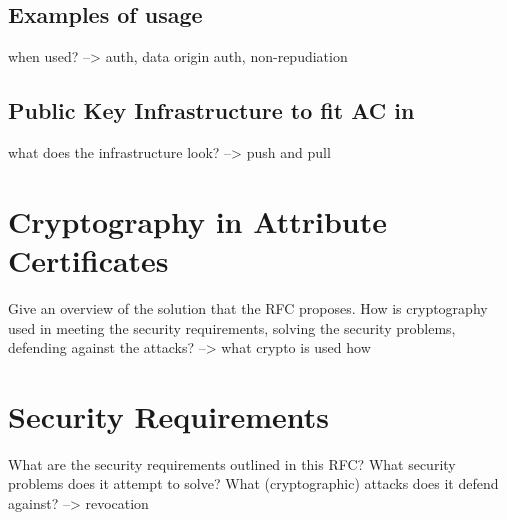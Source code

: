 \documentclass[10pt,conference,a4paper]{IEEEtran}
\begin{document}
\subsection{Examples of usage}
when used? --> auth, data origin auth, non-repudiation

\subsection{Public Key Infrastructure to fit AC in}
what does the infrastructure look? --> push and pull

\section{Cryptography in Attribute Certificates}
\label{cryptography_in_ac}
Give an overview of the solution that the RFC proposes. How is cryptography used in meeting the security requirements, solving the security problems, defending against the attacks?
--> what crypto is used how

\section{Security Requirements}
\label{security_requirements}
What are the security requirements outlined in this RFC? What security problems does it attempt to solve? What (cryptographic) attacks does it defend against?
--> revocation



\end{document}
